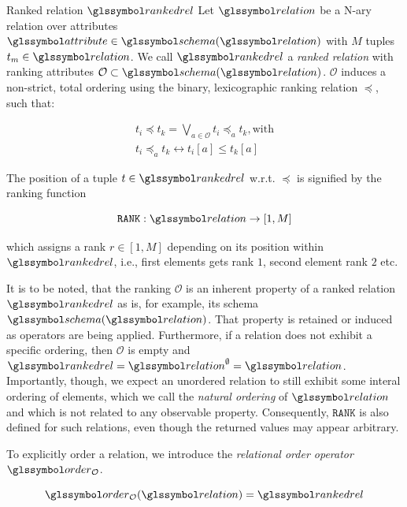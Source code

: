 \begin{definition}[label=definition:ranked_relation]{Ranked relation $\rankedrel$}{}
Let $\relation$ be a N-ary relation over attributes $\attribute \in \schema (\relation)$ with $M$ tuples $t_m \in \relation$. We call $\rankedrel$ a \emph{ranked relation} with ranking attributes $\mathcal{O} \subset \schema (\relation)$. $\mathcal{O}$ induces a non-strict, total ordering using the binary, lexicographic ranking relation $\preceq$, such that:

\begin{gather*}
    t_i \preceq t_k  = \bigvee_{a \in \mathcal{O}} t_i \preceq_{a} t_k, \textrm{with} \\ 
    t_i \preceq_{a} t_k  \leftrightarrow t_i \left[ a \right] \leq t_k \left[ a \right]
\end{gather*}

The position of a tuple $t \in \rankedrel$ w.r.t. $\preceq$ is signified by the ranking function

\begin{equation*}
    \mathtt{RANK}: \relation \rightarrow \left[ 1, M \right]
\end{equation*}

which assigns a rank $r \in \left[ 1, M \right]$ depending on its position within $\rankedrel$, i.e., first elements gets rank $1$, second element rank $2$ etc.

\end{definition}

It is to be noted, that the ranking $\mathcal{O}$ is an inherent property of a ranked relation $\rankedrel$ as is, for example, its schema $\schema(\relation)$. That property is retained or induced as operators are being applied. Furthermore, if a relation does not exhibit a specific ordering, then $\mathcal{O}$ is empty and $\rankedrel = \relation^{\emptyset} = \relation$. Importantly, though, we expect an unordered relation to still exhibit some interal ordering of elements, which we call the \emph{natural ordering} of $\relation$ and which is not related to any observable property. Consequently, $\mathtt{RANK}$ is also defined for such relations, even though the returned values may appear arbitrary.

To explicitly order a relation, we introduce the \emph{relational order operator} $\order_{\mathcal{O}}$.

\begin{equation}
    \label{equation:rel_alg_tau}
    \order_{\mathcal{O}}(\relation) = \rankedrel
\end{equation}

